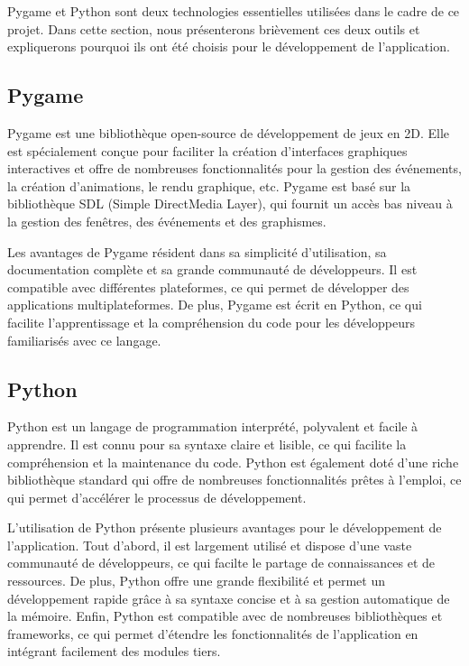 \documentclass[12pt,a4paper]{report}
\begin{document}
Pygame et Python sont deux technologies essentielles utilisées dans le cadre de ce projet. Dans cette section, nous présenterons brièvement ces deux outils et expliquerons pourquoi ils ont été choisis pour le développement de l'application.

\subsection{Pygame}

Pygame est une bibliothèque open-source de développement de jeux en 2D. Elle est spécialement conçue pour faciliter la création d'interfaces graphiques interactives et offre de nombreuses fonctionnalités pour la gestion des événements, la création d'animations, le rendu graphique, etc. Pygame est basé sur la bibliothèque SDL (Simple DirectMedia Layer), qui fournit un accès bas niveau à la gestion des fenêtres, des événements et des graphismes.

Les avantages de Pygame résident dans sa simplicité d'utilisation, sa documentation complète et sa grande communauté de développeurs. Il est compatible avec différentes plateformes, ce qui permet de développer des applications multiplateformes. De plus, Pygame est écrit en Python, ce qui facilite l'apprentissage et la compréhension du code pour les développeurs familiarisés avec ce langage.

\subsection{Python}

Python est un langage de programmation interprété, polyvalent et facile à apprendre. Il est connu pour sa syntaxe claire et lisible, ce qui facilite la compréhension et la maintenance du code. Python est également doté d'une riche bibliothèque standard qui offre de nombreuses fonctionnalités prêtes à l'emploi, ce qui permet d'accélérer le processus de développement.

L'utilisation de Python présente plusieurs avantages pour le développement de l'application. Tout d'abord, il est largement utilisé et dispose d'une vaste communauté de développeurs, ce qui facilte le partage de connaissances et de ressources. De plus, Python offre une grande flexibilité et permet un développement rapide grâce à sa syntaxe concise et à sa gestion automatique de la mémoire. Enfin, Python est compatible avec de nombreuses bibliothèques et frameworks, ce qui permet d'étendre les fonctionnalités de l'application en intégrant facilement des modules tiers.
\newpage
\end{document}
